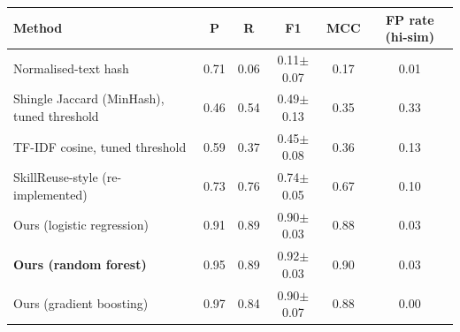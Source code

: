 \begin{tabular}{lccccc}
\toprule
Method & P & R & F1 & MCC & FP rate (hi-sim) \\
\midrule
Normalised-text hash & 0.71 & 0.06 & 0.11$\pm$0.07 & 0.17 & 0.01 \\
Shingle Jaccard (MinHash), tuned threshold & 0.46 & 0.54 & 0.49$\pm$0.13 & 0.35 & 0.33 \\
TF-IDF cosine, tuned threshold & 0.59 & 0.37 & 0.45$\pm$0.08 & 0.36 & 0.13 \\
SkillReuse-style (re-implemented) & 0.73 & 0.76 & 0.74$\pm$0.05 & 0.67 & 0.10 \\
\midrule
Ours (logistic regression) & 0.91 & 0.89 & 0.90$\pm$0.03 & 0.88 & 0.03 \\
\textbf{Ours (random forest)} & 0.95 & 0.89 & 0.92$\pm$0.03 & 0.90 & 0.03 \\
Ours (gradient boosting) & 0.97 & 0.84 & 0.90$\pm$0.07 & 0.88 & 0.00 \\
\bottomrule
\end{tabular}
